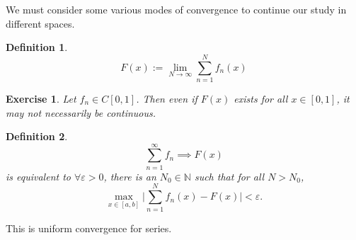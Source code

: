 \documentclass{article}
\newtheorem{defn}{Definition}[section]
\newtheorem{exer}{Exercise}[section]
\begin{document}
We must consider some various modes of convergence to continue our study in different spaces.

\begin{defn}
$$
F(x) := \lim_{N \to \infty} \sum_{n=1}^{N} f_{n}(x)
$$
\end{defn}

\begin{exer}
Let $f_{n} \in C[0,1]$. Then even if $F(x)$ exists for all $x \in [0,1]$, it may not necessarily be continuous.
\end{exer}

\begin{defn}
$$
\sum_{n=1}^{\infty} f_{n} \implies F(x)
$$
is equivalent to $\forall \varepsilon >0$, there is an $N_{0} \in \mathbb{N}$ such that for all $N > N_{0}$,
$$
\max_{x \in [a,b]} \Big\vert \sum_{n=1}^{N} f_{n}(x) - F(x) \Big\vert < \varepsilon.
$$
\end{defn}
This is uniform convergence for series.
\end{document}
